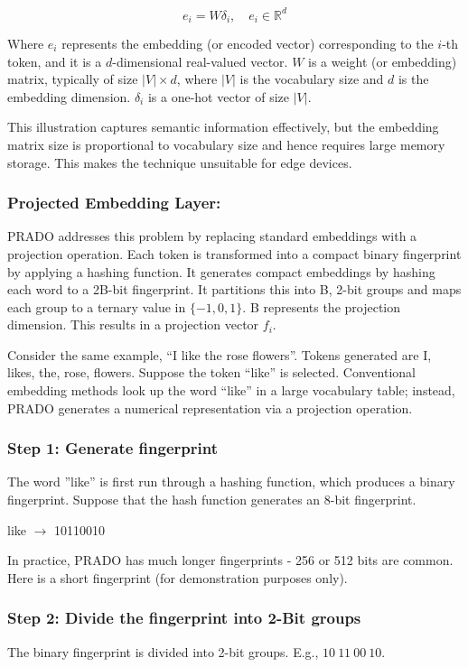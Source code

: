 \begin{equation}
  e_{i} = W \delta_{i}, \quad e_{i} \in \mathbb{R}^{d}
  \label{eq:ch3_3_1}
\end{equation}

\noindent Where $e_{i}$ represents the embedding (or encoded vector) corresponding to the $i$-th token, and it is a $d$-dimensional real-valued vector. $W$ is a weight (or embedding) matrix, typically of size $|V| \times d$, where $|V|$ is the vocabulary size and $d$ is the embedding dimension. $\delta_{i}$ is a one-hot vector of size $|V|$.

This illustration captures semantic information effectively, but the embedding matrix size is proportional to vocabulary size and hence requires large memory storage. This makes the technique unsuitable for edge devices.

\subsubsection{Projected Embedding Layer:}
PRADO addresses this problem by replacing standard embeddings with a projection operation. Each token is transformed into a compact binary fingerprint by applying a hashing function. It generates compact embeddings by hashing each word to a 2B-bit fingerprint. It partitions this into B, 2-bit groups and maps each group to a ternary value in $\{-1, 0, 1\}$. B represents the projection dimension. This results in a projection vector $f_{i}$.

Consider the same example, “I like the rose flowers”. Tokens generated are {I, likes, the, rose, flowers}. Suppose the token “like” is selected. Conventional embedding methods look up the word “like” in a large vocabulary table; instead, PRADO generates a numerical representation via a projection operation.

\subsubsection{Step 1: Generate fingerprint}
The word ''like'' is first run through a hashing function, which produces a binary fingerprint. Suppose that the hash function generates an 8-bit fingerprint.

like $\rightarrow$ 10110010

In practice, PRADO has much longer fingerprints - 256 or 512 bits are common. Here is a short fingerprint (for demonstration purposes only).

\subsubsection{Step 2: Divide the fingerprint into 2-Bit groups}
The binary fingerprint is divided into 2-bit groups. E.g., $10\ 11\ 00\ 10$.

